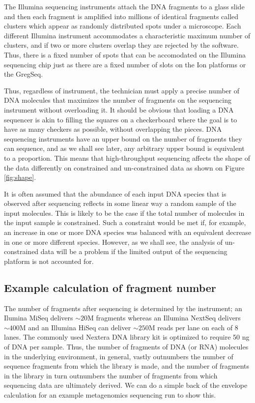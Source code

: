 \documentclass[onecolumn]{book}
\theoremstyle{definition}
\theoremstyle{definition}
\theoremstyle{definition}
\theoremstyle{remark}
\begin{document}
The Illumina sequencing instruments attach the DNA fragments to a glass
slide and then each fragment is amplified into millions of identical
fragments called clusters which appear as randomly distributed spots
under a microscope. Each different Illumina instrument accommodates a
characteristic maximum number of clusters, and if two or more clusters
overlap they are rejected by the software. Thus, there is a fixed number
of spots that can be accomodated on the Illumina sequencing chip just as
there are a fixed number of slots on the Ion platforms or the GregSeq.

Thus, regardless of instrument, the technician must apply a precise
number of DNA molecules that maximizes the number of fragments on the
sequencing instrument without overloading it. It should be obvious that
loading a DNA sequencer is akin to filling the squares on a checkerboard
where the goal is to have as many checkers as possible, without
overlapping the pieces. DNA sequencing instruments have an upper bound
on the number of fragments they can sequence, and as we shall see later,
any arbitrary upper bound is equivalent to a proportion. This means that
high-throughput sequencing affects the shape of the data differently on
constrained and un-constrained data as shown on Figure \ref{fig:shape}.

It is often assumed that the abundance of each input DNA species that is
observed after sequencing reflects in some linear way a random sample of
the input molecules. This is likely to be the case if the total number
of molecules in the input sample is constrained. Such a constraint would
be met if, for example, an increase in one or more DNA species was
balanced with an equivalent decrease in one or more different species.
However, as we shall see, the analysis of un-constrained data will be a
problem if the limited output of the sequencing platform is not
accounted for.

\hypertarget{example-calculation-of-fragment-number}{%
\subsection{Example calculation of fragment
number}\label{example-calculation-of-fragment-number}}

The number of fragments after sequencing is determined by the
instrument; an Ilumina MiSeq delivers \(\sim 20\)M fragments whereas an
Illumina NextSeq delivers \(\sim 400\)M and an Illumina HiSeq can
deliver \(\sim 250\)M reads per lane on each of 8 lanes. The commonly
used Nextera DNA library kit is optimized to require 50 ng of DNA per
sample. Thus, the number of fragments of DNA (or RNA) molecules in the
underlying environment, in general, vastly outnumbers the number of
sequence fragments from which the library is made, and the number of
fragments in the library in turn outnumbers the number of fragments from
which sequencing data are ultimately derived. We can do a simple back of
the envelope calculation for an example metagenomics sequencing run to
show this.
\end{document}
